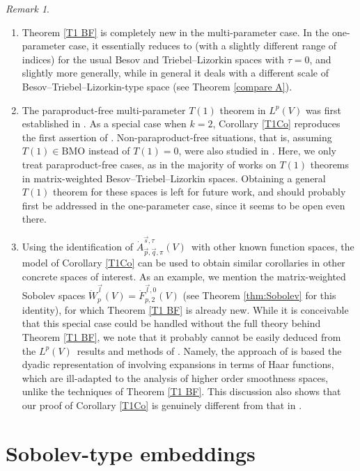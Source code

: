 \documentclass[11pt, reqno]{amsart}
\theoremstyle{definition}
\theoremstyle{remark}
\newtheorem{remark}[theorem]{Remark}
\numberwithin{equation}{section}
\newcommand{\vp}{\vec p}
\newcommand{\vq}{\vec q}
\newcommand{\vs}{\vec s}
\newcommand{\Atau}{\dot A^{\vs,\tau}_{\vp,\vq,\pi}}
\begin{document}
\begin{remark}\label{r12.33}\mbox{}
\begin{enumerate}[\rm(i)]
\item Theorem \ref{T1 BF} is completely new in the multi-parameter case.
In the one-parameter case, it essentially reduces to \cite[Theorem 6.18]{BHYY:1c} (with a slightly different range of indices) for the usual Besov and Triebel--Lizorkin spaces with $\tau=0$, and slightly more generally, while in general it deals with a different scale of Besov--Triebel--Lizorkin-type space (see Theorem \ref{compare A}).

\item The paraproduct-free multi-parameter $T(1)$ theorem in $L^p(V)$
was first established in \cite{DKPS}.
As a special case when $k=2$, Corollary \ref{T1Co}
reproduces the first assertion of
\cite[Theorem 1.1(1)]{DKPS}.
Non-paraproduct-free situations, that is, assuming $T(1)\in \mathrm{BMO}$
instead of $T(1)=0$, were also studied in \cite{DKPS,Vuo24}.
Here, we only treat paraproduct-free cases, as in the majority of works
on $T(1)$ theorems in matrix-weighted Besov--Triebel--Lizorkin spaces.
Obtaining a general $T(1)$ theorem for these spaces is left for future work, and should probably first be addressed in the one-parameter case, since it seems to be open even there.

\item Using the identification of $\Atau(V)$ with other known function spaces, the model of Corollary \ref{T1Co} can be used to obtain similar corollaries in other concrete spaces of interest. As an example, we mention the matrix-weighted Sobolev spaces $\dot W^{\vec l}_p(V)=\dot F^{\vec l,0}_{p,2}(V)$ (see Theorem \ref{thm:Sobolev} for this identity), for which Theorem \ref{T1 BF} is already new. While it is conceivable that this special case could be handled without the full theory behind Theorem \ref{T1 BF}, we note that it probably cannot be easily deduced from the $L^p(V)$ results and methods of \cite{DKPS}. Namely, the approach of \cite{DKPS} is based the dyadic representation of \cite{Mar12} involving expansions in terms of Haar functions, which are ill-adapted to the analysis of higher order smoothness spaces, unlike the techniques of Theorem \ref{T1 BF}. This discussion also shows that our proof of Corollary \ref{T1Co} is genuinely different from that in \cite{DKPS}.
\end{enumerate}
\end{remark}


\section{Sobolev-type embeddings}\label{embedding}
\end{document}
